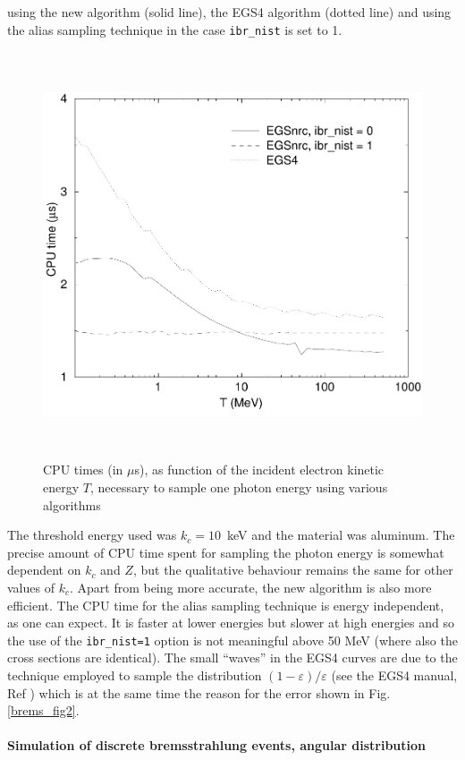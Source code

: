 using the new algorithm (solid line), 
the EGS4 algorithm (dotted line) and using the alias sampling technique 
in the case {\tt ibr\_nist} is set to 1.
\begin{figure}[htp]
\includegraphics[height=12cm,width=12cm]{figures/brem_times}
\caption[CPU times for bremsstrahlung sampling]{\label{brems_times} 
CPU times (in $\mu$s), as function of the incident electron kinetic 
energy $T$, necessary to sample one photon energy using various 
algorithms} 
\end{figure}
The threshold energy used was $k_c = 10$~keV and the material 
was aluminum. The precise 
amount of CPU time spent for sampling the photon energy 
is somewhat dependent on $k_c$ and $Z$, but the qualitative 
behaviour remains the same for other values of $k_c$. 
Apart from being more accurate, the new algorithm is also more 
efficient. The CPU time for the alias sampling technique is 
energy independent, as one can expect. It is faster at lower 
energies but slower at high energies and so the use 
of the {\tt ibr\_nist=1} option is not meaningful above 50 MeV 
(where also the cross sections are identical). The small 
``waves'' in the EGS4 curves are due to the technique employed 
to sample the distribution $(1-\varepsilon)/\varepsilon$ 
(see the EGS4 manual, Ref \cite{Ne85}) which is at the same time 
the reason for the error shown in Fig. \ref{brems_fig2}. 

\paragraph{Simulation of discrete bremsstrahlung events, 
angular distribution}
\hfill
{}

